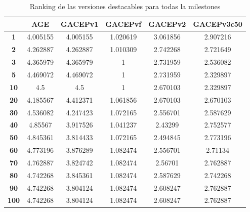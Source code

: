 \begin{table}[h]
\begin{tabular}{c|c|c|c|c|c|}
\cline{2-6}
\multicolumn{1}{l|}{}              & \textbf{AGE} & \textbf{GACEPv1} & \textbf{GACEPvf}                & \textbf{GACEPv2} & \textbf{GACEPv3c50} \\ \hline
\multicolumn{1}{|c|}{\textbf{1}}   & 4.005155      & 4.005155         & {\color[HTML]{4169E1} 1.020619} & 3.061856         & 2.907216            \\ \hline
\multicolumn{1}{|c|}{\textbf{2}}   & 4.262887      & 4.262887         & {\color[HTML]{4169E1} 1.010309} & 2.742268         & 2.721649            \\ \hline
\multicolumn{1}{|c|}{\textbf{3}}   & 4.365979      & 4.365979         & {\color[HTML]{4169E1} 1}        & 2.731959         & 2.536082            \\ \hline
\multicolumn{1}{|c|}{\textbf{5}}   & 4.469072      & 4.469072         & {\color[HTML]{4169E1} 1}        & 2.731959         & 2.329897            \\ \hline
\multicolumn{1}{|c|}{\textbf{10}}  & 4.5           & 4.5              & {\color[HTML]{4169E1} 1}        & 2.670103         & 2.329897            \\ \hline
\multicolumn{1}{|c|}{\textbf{20}}  & 4.185567      & 4.412371         & {\color[HTML]{4169E1} 1.061856} & 2.670103         & 2.670103            \\ \hline
\multicolumn{1}{|c|}{\textbf{30}}  & 4.536082      & 4.247423         & {\color[HTML]{4169E1} 1.072165} & 2.556701         & 2.587629            \\ \hline
\multicolumn{1}{|c|}{\textbf{40}}  & 4.85567       & 3.917526         & {\color[HTML]{4169E1} 1.041237} & 2.43299          & 2.752577            \\ \hline
\multicolumn{1}{|c|}{\textbf{50}}  & 4.845361      & 3.814433         & {\color[HTML]{4169E1} 1.072165} & 2.494845         & 2.773196            \\ \hline
\multicolumn{1}{|c|}{\textbf{60}}  & 4.773196      & 3.876289         & {\color[HTML]{4169E1} 1.082474} & 2.556701         & 2.71134             \\ \hline
\multicolumn{1}{|c|}{\textbf{70}}  & 4.762887      & 3.824742         & {\color[HTML]{4169E1} 1.082474} & 2.56701          & 2.762887            \\ \hline
\multicolumn{1}{|c|}{\textbf{80}}  & 4.742268      & 3.845361         & {\color[HTML]{4169E1} 1.082474} & 2.587629         & 2.742268            \\ \hline
\multicolumn{1}{|c|}{\textbf{90}}  & 4.742268      & 3.804124         & {\color[HTML]{4169E1} 1.082474} & 2.608247         & 2.762887            \\ \hline
\multicolumn{1}{|c|}{\textbf{100}} & 4.742268      & 3.804124         & {\color[HTML]{4169E1} 1.082474} & 2.608247         & 2.762887            \\ \hline
\end{tabular}
\caption{\label{RankingFinal}Ranking de las versiones destacables para todas la milestones}
\end{table}

